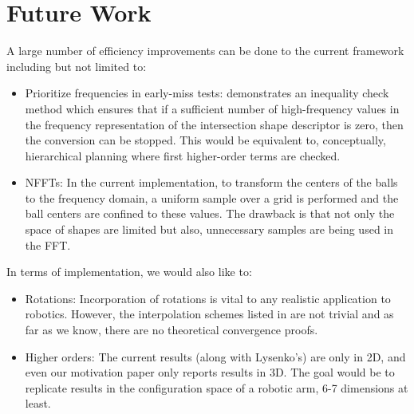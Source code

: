 \documentclass[letterpaper, 10 pt, conference]{ieeeconf}
\begin{document}
\section{Future Work}

A large number of efficiency improvements can be done to the current framework including but not limited to:

\begin{itemize}
 \item Prioritize frequencies in early-miss tests: \cite{lysenko2013fourier} demonstrates an
 inequality check method which ensures that if a sufficient number of high-frequency values in the
 frequency representation of the intersection shape descriptor is zero, then the conversion can
 be stopped. This would be equivalent to, conceptually, hierarchical planning where first higher-order
 terms are checked. 
 
 \item NFFTs: In the current implementation, to transform the centers of the balls to the frequency 
 domain, a uniform sample over a grid is performed and the ball centers are confined to these values.
 The drawback is that not only the space of shapes are limited but also, unnecessary samples are being
 used in the FFT.
\end{itemize}

In terms of implementation, we would also like to:
\begin{itemize}
 \item Rotations: Incorporation of rotations is vital to any realistic application to robotics.
 However, the interpolation schemes listed in \cite{lysenko2013fourier, kavraki1995computation} are
 not trivial and as far as we know, there are no theoretical convergence proofs.
 \item Higher orders: The current results (along with Lysenko's) are only in 2D, and even our
 motivation paper \cite{behandish2016analytic} only reports results in 3D. The goal would be to 
 replicate results in the configuration space of a robotic arm, 6-7 dimensions at least.
\end{itemize}

\end{document}
